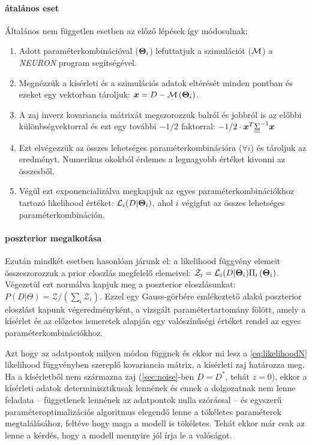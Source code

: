 \paragraph{átalános eset}
Általános nem független esetben az előző lépések így módosulnak:
\begin{enumerate}\label{meth:dependet}
	\item Adott paraméterkombinációval ($\mbox{\boldmath$ \Theta $}_i$) lefuttatjuk a szimulációt ($\mathcal{M}$) a \textit{NEURON} program segítségével.
	\item Megnézzük a kísérleti és a szimulációs adatok eltérését minden pontban és ezeket egy vektorban tároljuk: $\mbox{\boldmath$ x $} = D-\mathcal{M}\left(\mbox{\boldmath$ \Theta $}_i\right)$.
	\item A zaj inverz kovariancia mátrixát megszorozzuk balról és jobbról is az előbbi különbségvektorral és ezt egy további $-1/2$ faktorral: $-1/2\cdot\mbox{\boldmath$ x $}^T\underline{\underline{\Sigma}}^{-1}\mbox{\boldmath$ x $}$
	\item Ezt elvégezzük az összes lehetséges paraméterkombinációra ($\forall i$) és tároljuk az eredményt. Numerikus okokból érdemes a legnagyobb értéket kivonni az összesből.
	\item Végül ezt exponencializálva megkapjuk az egyes paraméterkombinációkhoz tartozó likelihood értéket: $ \mathcal{L}_i(D|\mbox{\boldmath$ \Theta $}_i)$, ahol $i$ végigfut az összes lehetséges paraméterkombináción.
\end{enumerate}

\paragraph{poszterior megalkotása}
Ezután mindkét esetben hasonlóan járunk el: a likelihood függvény elemeit összeszorozzuk a prior eloszlás megfelelő elemeivel: $\mathcal{Z}_i=\mathcal{L}_i(D|\mbox{\boldmath$ \Theta $}_i)\Pi_i\left(\mbox{\boldmath$ \Theta $}_i\right)$. Végezetül ezt normálva kapjuk meg a poszterior eloszlásunkat: $P\left(D|\Theta\right) = \mathcal{Z}/\left(\sum_{i}\mathcal{Z}_i\right)$. Ezzel egy Gauss-görbére emlékeztető alakú poszterior eloszlást kapunk végeredményként, a vizsgált paramétertartomány fölött, amely a kísérlet és az előzetes ismeretek alapján egy valószínűségi értéket rendel az egyes paraméterkombinációkhoz.

Azt hogy az adatpontok milyen módon függnek és ekkor mi lesz a \ref{eq:likelihoodN} likelihood függvényben szereplő kovariancia mátrix, a kísérleti zaj határozza meg. Ha a kísérletből nem származna zaj (\ref{sec:noise}-ben $D = D^*$, tehát $z=0$), ekkor a kísérleti adatok determinisztikusak lennének és ennek a dolgozatnak nem lenne feladata -- függetlenek lennének az adatpontok nulla szórással -- és egyszerű paraméteroptimalizációs algoritmus elegendő lenne a tökéletes paraméterek megtalálásához, feltéve hogy maga a modell is tökéletes. Tehát ekkor már csak az lenne a kérdés, hogy a modell mennyire jól írja le a valóságot.

